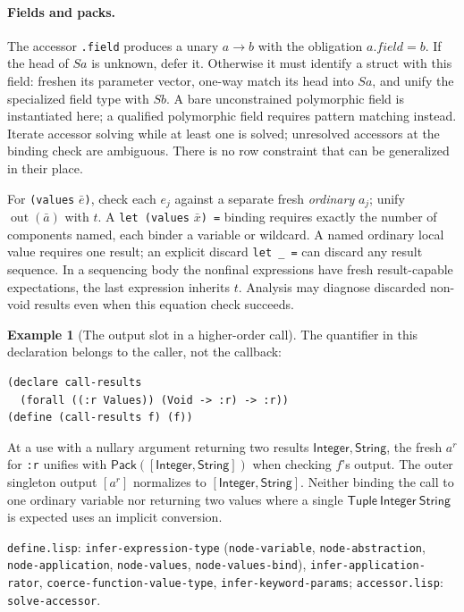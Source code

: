 \documentclass[11pt]{article}
\theoremstyle{definition}
\newtheorem{example}[theorem]{Example}
\newcommand{\code}[1]{\texttt{#1}}
\newcommand{\src}[1]{\nolinkurl{#1}}
\newcommand{\pack}{\operatorname{out}}
\newcommand{\Pack}{\mathsf{Pack}}
\newcommand{\Int}{\mathsf{Integer}}
\newcommand{\Str}{\mathsf{String}}
\newcommand{\arr}{\mathbin{\to}}
\begin{document}
\paragraph{Fields and packs.}
The accessor \code{.field} produces a unary $a\arr b$ with the obligation
$a.\mathit{field}=b$. If the head of $Sa$ is unknown, defer it. Otherwise
it must identify a struct with this field: freshen its parameter vector,
one-way match its head into $Sa$, and unify the specialized field type with
$Sb$. A bare unconstrained polymorphic field is instantiated here; a
qualified polymorphic field requires pattern matching instead. Iterate
accessor solving while at least one is solved; unresolved accessors at the
binding check are ambiguous. There is no row constraint that can be
generalized in their place.

For \code{(values} $\bar e$\code{)}, check each $e_j$ against a separate
fresh \emph{ordinary} $a_j$; unify $\pack(\bar a)$ with $t$.
A \code{let (values} $\bar x$\code{) =} binding requires exactly the
number of components named, each binder a variable or wildcard. A named
ordinary local value requires one result; an explicit discard
\code{let \_ =} can discard any result sequence. In a sequencing body the
nonfinal expressions have fresh result-capable expectations, the last
expression inherits $t$. Analysis may diagnose discarded non-void results
even when this equation check succeeds.

\begin{example}[The output slot in a higher-order call]
The quantifier in this declaration belongs to the caller, not the callback:
\begin{verbatim}
(declare call-results
  (forall ((:r Values)) (Void -> :r) -> :r))
(define (call-results f) (f))
\end{verbatim}
At a use with a nullary argument returning two results $\Int,\Str$, the
fresh $a^r$ for \code{:r} unifies with $\Pack([\Int,\Str])$ when checking
$f$'s output. The outer singleton output $[a^r]$ normalizes to
$[\Int,\Str]$. Neither binding the call to one ordinary variable nor
returning two values where a single $\mathsf{Tuple}\ \Int\ \Str$ is expected
uses an implicit conversion.
\end{example}

\sources \src{define.lisp}: \src{infer-expression-type}
(\src{node-variable}, \src{node-abstraction}, \src{node-application},
\src{node-values}, \src{node-values-bind}), \src{infer-application-rator},
\src{coerce-function-value-type}, \src{infer-keyword-params};
\src{accessor.lisp}: \src{solve-accessor}.
\end{document}
